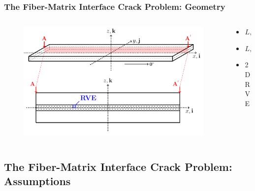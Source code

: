 \documentclass[first,firstsupp,lastsupp,last,hyperref,table]{ETHclass}
\begin{document}
\begin{frame}
\frametitle{\small The Fiber-Matrix Interface Crack Problem: Geometry}
\vspace{-1cm}
\centering
\begin{columns}[c]
\begin{column}{0.85\textwidth}
\begin{figure}
\centering
\includegraphics[width=\columnwidth]{laminate-section.pdf}
\end{figure}
\end{column}
\begin{column}{0.15\textwidth}
\scriptsize
\begin{itemize}[label=]
\item $L, W >> t$
\item $L, W \rightarrow \infty$
\item 2D RVE
\end{itemize}
\end{column}
\end{columns}

\end{frame}

\subsection[Assumptions]{The Fiber-Matrix Interface Crack Problem: Assumptions}
\end{document}
